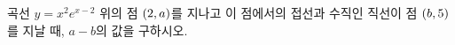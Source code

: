 곡선 $y=x^2e^{x-2}$ 위의 점 $(2{,}\mkern3mu\mathopen{}a)$를 지나고 이 점에서의 접선과 수직인 직선이 점 $(b{,}\mkern3mu\mathopen{}5)$를 지날 때, $a-b$의 값을 구하시오.
